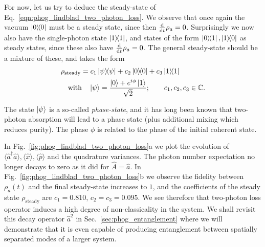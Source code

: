 For now, let us try to deduce the steady-state of Eq.~\ref{eqn:phog_lindblad_two_photon_loss}. We observe that once again the vacuum $\dyad{0}$ must be a steady state, since then $\frac{\mathrm{d}}{\mathrm{d}t} \rho_a=0$. Surprisingly we now also have the single-photon state $\dyad{1}$, and states of the form $\dyad{0}{1}, \dyad{1}{0}$ as steady states, since these also have $\frac{\mathrm{d}}{\mathrm{d}t} \rho_a=0$. The general steady-state should be a mixture of these, and takes the form
\begin{align}\label{eqn:phog_phase_state}
&\rho_{\text{steady}} = c_1 \dyad{\psi} + c_2 \dyad{0} + c_3 \dyad{1} \notag \\
%
&\qq{with} \ket{\psi} = \frac{\ket{0} + e^{i \phi} \ket{1}}{\sqrt{2}};  \qq{} c_1, c_2, c_3 \in \mathbb{C}.
\end{align}

\noindent The state $\ket{\psi}$ is a so-called \emph{phase-state}, and it has long been known that two-photon absorption will lead to a phase state \cite{Ezaki1999} (plus additional mixing \cite{Alexanian2000, *Ezaki2000} which reduces purity). The phase $\phi$ is related to the phase of the initial coherent state. 

In Fig.~\ref{fig:phog_lindblad_two_photon_loss}a we plot the evolution of $\langle \hat{a}^\dagger \hat{a}\rangle, \langle \hat{x}\rangle, \langle \hat{p}\rangle$ and the quadrature variances. The photon number expectation no longer decays to zero as it did for $\hat{A}=\hat{a}$. %
 In Fig.~\ref{fig:phog_lindblad_two_photon_loss}b we observe the fidelity between $\rho_a\left(t\right)$ and the final steady-state increases to $1$, and the coefficients of the steady state $\rho_{\text{steady}}$ are $c_1 = 0.810$, $c_2 = c_3 = 0.095$. We see therefore that two-photon loss operator induces a high degree of non-classicality in the system. We shall revisit this decay operator $\hat{a}^2$ in Sec.~\ref{sec:phog_entanglement} where we will demonstrate that it is even capable of producing entanglement between spatially separated modes of a larger system.


